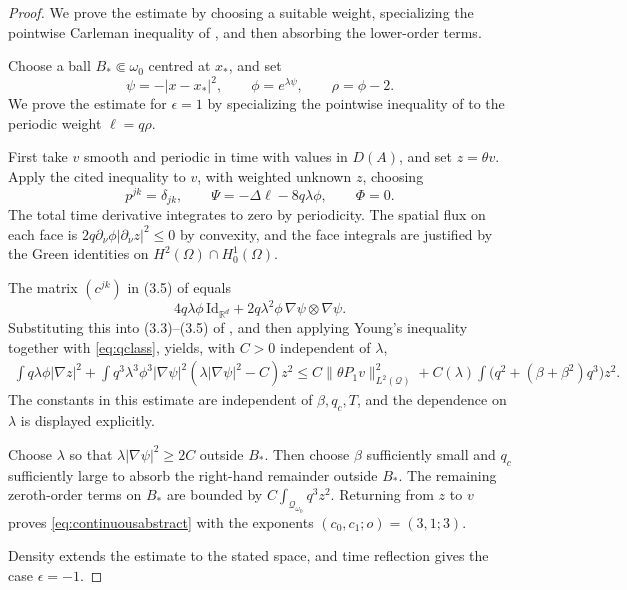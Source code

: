 \documentclass[print,wide,eng]{draft}
\begin{document}
\begin{proof}
We prove the estimate by choosing a suitable weight, specializing the pointwise Carleman inequality of \cite[Corollary~3.1]{fu2019carleman}, and then absorbing the lower-order terms.


Choose a ball $B_*\Subset\omega_0$ centred at $x_*$, and set
\[
\psi=-|x-x_*|^2,
\qquad
\phi=e^{\lambda\psi},
\qquad
\rho=\phi-2.
\]
We prove the estimate for $\epsilon=1$ by specializing the pointwise inequality of \cite[Corollary~3.1]{fu2019carleman} to the periodic weight $\ell=q\rho$.



First take $v$ smooth and periodic in time with values in $D(A)$, and set $z=\theta v$. Apply the cited inequality to $v$, with weighted unknown $z$, choosing
$$
p^{jk}=\delta_{jk},
\qquad
\Psi=-\Delta\ell-8q\lambda\phi,
\qquad
\Phi=0.
$$
The total time derivative integrates to zero by periodicity. The spatial flux on each face is $2q\partial_\nu\phi|\partial_\nu z|^2\le0$ by convexity, and the face integrals are justified by the Green identities on $H^2(\Omega)\cap H_0^1(\Omega)$.

The matrix $(c^{jk})$ in (3.5) of \cite{fu2019carleman} equals
$$
4q\lambda\phi\,\mathrm{Id}_{\mathbb R^d}
+2q\lambda^2\phi\,\nabla\psi\otimes\nabla\psi.
$$
Substituting this into (3.3)--(3.5) of \cite{fu2019carleman}, and then applying Young's inequality together with \cref{eq:qclass}, yields, with $C>0$ independent of $\lambda$,
%
\begin{align}\label{eq:heatcross}
\int q\lambda\phi|\nabla z|^2
+\int q^3\lambda^3\phi^3|\nabla\psi|^2
(\lambda|\nabla\psi|^2-C)z^2
\le C\|\theta P_1v\|_{L^2(\mathcal Q)}^2
+C(\lambda)\int\bigl(q^2+(\beta+\beta^2)q^3\bigr)z^2.
\end{align}
%
The constants in this estimate are independent of $\beta,q_c,T$, and the dependence on $\lambda$ is displayed explicitly.


Choose $\lambda$ so that $\lambda|\nabla\psi|^2\ge2C$ outside $B_*$. Then choose $\beta$ sufficiently small and $q_c$ sufficiently large to absorb the right-hand remainder outside $B_*$. The remaining zeroth-order terms on $B_*$ are bounded by
$
C\int_{\mathcal Q_{\omega_0}}q^3z^2$.
Returning from $z$ to $v$ proves \cref{eq:continuousabstract} with the exponents $(c_0,c_1;o)=(3,1;3)$.


Density extends the estimate to the stated space, and time reflection gives the case $\epsilon=-1$.
\end{proof}
%
%
\end{document}
